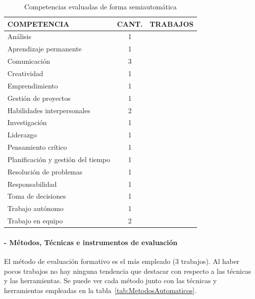 \begin{table}
  \begin{center}
  \begin{tabular}{| m{6cm} | c | m{5cm} |}
    \hline
    COMPETENCIA & CANT. & TRABAJOS\\
    \hline
    \hline
    Análisis & 1 & \cite{andre2011formal} \\
    \hline
    Aprendizaje permanente & 1 & \cite{andre2011formal}   \\
    \hline
    Comunicación & 3 & \cite{andre2011formal,rayon2014web,bedek2011behavioral}  \\
    \hline
    Creatividad & 1 & \cite{andre2011formal}   \\
    \hline
    Emprendimiento & 1 & \cite{guenaga2013serious} \\
    \hline
    Gestión de proyectos & 1 & \cite{andre2011formal} \\
    \hline
    Habilidades interpersonales & 2 & \cite{andre2011formal,rayon2014web}  \\
    \hline
    Investigación & 1 & \cite{andre2011formal}  \\
    \hline
    Liderazgo & 1 & \cite{andre2011formal}  \\
    \hline
    Pensamiento crítico & 1 & \cite{andre2011formal} \\
    \hline
    Planificación y gestión del tiempo & 1 & \cite{andre2011formal} \\
    \hline
    Resolución de problemas & 1 & \cite{guenaga2013serious} \\
    \hline
    Responsabilidad & 1 & \cite{andre2011formal}  \\
    \hline 
    Toma de decisiones & 1 & \cite{andre2011formal}   \\
    \hline
    Trabajo autónomo & 1 & \cite{andre2011formal} \\
    \hline
    Trabajo en equipo & 2 & \cite{andre2011formal,fidalgo:2015}  \\
    \hline
  \end{tabular}
\end{center}
\caption{Competencias evaluadas de forma semiautomática}
\label{tab:CompetenciasAutomaticas}
\end{table} 

\paragraph*{- Métodos, Técnicas e instrumentos de evaluación}
El método de evaluación formativo es el más empleado (3 trabajos). Al haber pocos trabajos no hay ninguna tendencia que destacar con respecto a las técnicas y las herramientas. Se puede ver cada método junto con las técnicas y herramientas empleadas en la tabla~\ref{tab:MetodosAutomaticos}.

